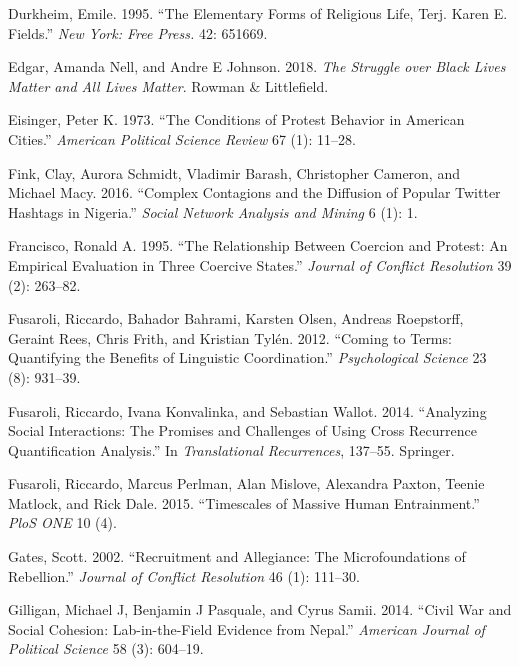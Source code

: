 \documentclass[
  english,
  man]{apa6}
\begin{document}
\leavevmode\hypertarget{ref-durkheim1995elementary}{}%
Durkheim, Emile. 1995. ``The Elementary Forms of Religious Life, Terj. Karen E. Fields.'' \emph{New York: Free Press.} 42: 651669.

\leavevmode\hypertarget{ref-edgar2018struggle}{}%
Edgar, Amanda Nell, and Andre E Johnson. 2018. \emph{The Struggle over Black Lives Matter and All Lives Matter}. Rowman \& Littlefield.

\leavevmode\hypertarget{ref-eisinger1973conditions}{}%
Eisinger, Peter K. 1973. ``The Conditions of Protest Behavior in American Cities.'' \emph{American Political Science Review} 67 (1): 11--28.

\leavevmode\hypertarget{ref-fink2016complex}{}%
Fink, Clay, Aurora Schmidt, Vladimir Barash, Christopher Cameron, and Michael Macy. 2016. ``Complex Contagions and the Diffusion of Popular Twitter Hashtags in Nigeria.'' \emph{Social Network Analysis and Mining} 6 (1): 1.

\leavevmode\hypertarget{ref-francisco1995relationship}{}%
Francisco, Ronald A. 1995. ``The Relationship Between Coercion and Protest: An Empirical Evaluation in Three Coercive States.'' \emph{Journal of Conflict Resolution} 39 (2): 263--82.

\leavevmode\hypertarget{ref-fusaroli2012coming}{}%
Fusaroli, Riccardo, Bahador Bahrami, Karsten Olsen, Andreas Roepstorff, Geraint Rees, Chris Frith, and Kristian Tylén. 2012. ``Coming to Terms: Quantifying the Benefits of Linguistic Coordination.'' \emph{Psychological Science} 23 (8): 931--39.

\leavevmode\hypertarget{ref-fusaroli2014analyzing}{}%
Fusaroli, Riccardo, Ivana Konvalinka, and Sebastian Wallot. 2014. ``Analyzing Social Interactions: The Promises and Challenges of Using Cross Recurrence Quantification Analysis.'' In \emph{Translational Recurrences}, 137--55. Springer.

\leavevmode\hypertarget{ref-fusaroli2015timescales}{}%
Fusaroli, Riccardo, Marcus Perlman, Alan Mislove, Alexandra Paxton, Teenie Matlock, and Rick Dale. 2015. ``Timescales of Massive Human Entrainment.'' \emph{PloS ONE} 10 (4).

\leavevmode\hypertarget{ref-gates2002recruitment}{}%
Gates, Scott. 2002. ``Recruitment and Allegiance: The Microfoundations of Rebellion.'' \emph{Journal of Conflict Resolution} 46 (1): 111--30.

\leavevmode\hypertarget{ref-gilligan2014civil}{}%
Gilligan, Michael J, Benjamin J Pasquale, and Cyrus Samii. 2014. ``Civil War and Social Cohesion: Lab-in-the-Field Evidence from Nepal.'' \emph{American Journal of Political Science} 58 (3): 604--19.
\end{document}
